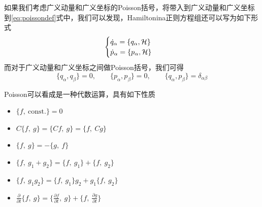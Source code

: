 如果我们考虑广义动量和广义坐标的Poisson括号，将带入到广义动量和广义坐标到\eqref{eq:poissondef}式中，我们可以发现，Hamiltonina正则方程组还可以写为如下形式
\begin{equation}
    \begin{cases}
        \dot q_\alpha = \{ q_\alpha,\mathcal{H}\}\\
        \dot p_\alpha = \{p_\alpha, \mathcal{H} \}
    \end{cases}
\end{equation}
而对于广义动量和广义坐标之间做Poisson括号，我们可得
\begin{equation}
    \{ q_\alpha, q_\beta\}=0,\qquad\{ p_\alpha, p_\beta\}=0,\qquad \{ q_\alpha, p_\beta\} = \delta_{\alpha\beta}
\end{equation}

Poisson可以看成是一种代数运算，具有如下性质
\begin{itemize}
    \item [i.] $\{f,~\mathrm{const.}\}=0$
    \item [ii.] $C\{f,~g\}=\{Cf,~g\} = \{f,~Cg\}$
    \item [iii.] $\{f,~g\}=-\{g,~f\}$
    \item [iv.] $\{f,~g_1+g_2\}=\{f,~g_1\}+\{f,~g_2\}$
    \item [v.] $\{f,~g_1 g_2\} = \{f,~g_1\}g_2 + g_1 \{f,~g_2\}$
    \item [vi.] $\frac{\partial }{\partial t}\{f,~g\} = \{\frac{\partial f}{\partial t},~g\} + \{f,~\frac{\partial g}{\partial t}\}$
\end{itemize}

